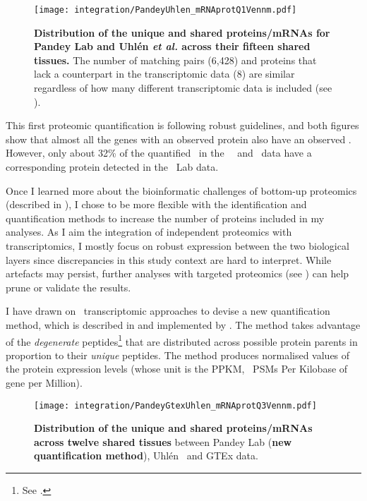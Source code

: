 \begin{figure}[!htb]
    \texttt{[image: integration/PandeyUhlen\_mRNAprotQ1Vennm.pdf]}\centering
    \vspace{-3.5mm}
    \caption[Distribution of the unique and shared proteins/mRNAs for Pandey Lab
    and Uhlén \textit{et al.} across fifteen tissues.]{%
    \label{fig:PU_vennQ1}\textbf{Distribution of the unique and shared proteins/mRNAs
    for Pandey Lab and Uhlén \textit{et al.} across their fifteen shared tissues.}
    The number of matching pairs (6,428) and proteins that lack a counterpart in
    the transcriptomic data (8) are similar regardless of how many different
    transcriptomic data is included (see ).}
\end{figure}

This first proteomic quantification is following robust guidelines,
and both figures show that
almost all the genes with an observed protein
also have an observed \mRNA{}.
However, only about 32\% of the quantified \mRNAs\
in the \uhlen\ \etal\ and \gtex\ data
have a corresponding protein detected in the \pandey\ Lab data.\mybr\

Once I learned more about the bioinformatic challenges of bottom-up proteomics
(described in \Cref{sec:bioinfProt}),
I chose to be more flexible with the identification and quantification methods
to increase the number of proteins included in my analyses.
As I aim the integration of independent proteomics with transcriptomics,
I mostly focus on robust expression between the two biological layers
since discrepancies in this study context are hard to interpret.
While artefacts may persist,
further analyses with targeted proteomics (see )
can help prune or validate the results.

I have drawn on \Rnaseq\ transcriptomic approaches to devise
a new quantification method, which is described in 
and implemented by \james.
The method takes advantage of the \emph{degenerate} peptides\footnote{%
See \Cref{subsec:proteinInference}.}
that are distributed across possible protein parents
in proportion to their \emph{unique} peptides.
The method produces normalised values of the protein expression levels
(whose unit is the \gls{PPKM}, \ie\ \glspl{PSM} Per Kilobase of gene per Million).

\begin{figure}[!ht]
    \texttt{[image: integration/PandeyGtexUhlen\_mRNAprotQ3Vennm.pdf]}\centering
    \vspace{-4mm}
    \caption[Distribution of the unique and shared proteins/mRNAs
    across the three datasets and twelve tissues
    (new protein quantification method)]{\label{fig:PGU_venQ3}%
    \textbf{Distribution of the unique and shared proteins/mRNAs
    across twelve shared tissues} between  Pandey Lab
    (\textbf{new quantification method}),
    Uhlén \etal\ and GTEx data.}
\end{figure}


